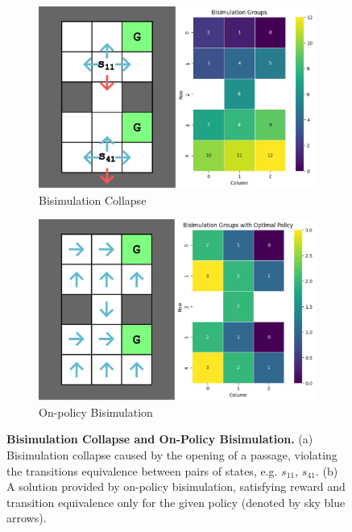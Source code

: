 \begin{figure}[h]
    \centering
    \begin{subfigure}{0.45\textwidth}
    \includegraphics[width=\linewidth]{Figures/bisimulation_passage.jpg}
        \caption{Bisimulation Collapse}
        \label{fig:bisimulation_collapse}
    \end{subfigure}
    \hfill
    \begin{subfigure}{0.45\textwidth}
        \includegraphics[width=\linewidth]{Figures/on_policy_bisimulation.jpg}
        \caption{On-policy Bisimulation}
        \label{fig:on_policy_bisimulation}
    \end{subfigure}
    \caption[Bisimulation Collapse and On-Policy Bisimulation]{\textbf{Bisimulation Collapse and On-Policy Bisimulation.} (a) Bisimulation collapse caused by the opening of a passage, violating the transitions equivalence between pairs of states, e.g. $s_{11}$, $s_{41}$. (b) A solution provided by on-policy bisimulation, satisfying reward and transition equivalence only for the given policy (denoted by sky blue arrows).}
\end{figure}

